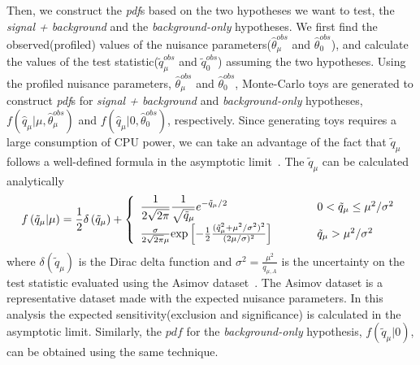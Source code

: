 %
Then, we construct the \textit{pdf}s based on the two hypotheses we 
want to test, the \textit{signal + background} and the \textit{background-only} hypotheses.
We first find the observed(profiled) values of the nuisance 
parameters($\hat{\theta}_\mu^{obs}$ and $\hat{\theta}_0^{obs}$),
and calculate the values of the test statistic($\tilde{q}_\mu^{obs}$ 
and $\tilde{q}_0^{obs}$) assuming the two hypotheses.
Using the profiled nuisance parameters, $\hat{\theta}_\mu^{obs}$ and $\hat{\theta}_0^{obs}$, 
Monte-Carlo toys are generated to construct \textit{pdf}s for \textit{signal + background}
and \textit{background-only} hypotheses, 
$f\left( \hat{q}_\mu | \mu, \hat{\theta}_\mu^{obs} \right)$ and 
$f\left( \hat{q}_\mu | 0, \hat{\theta}_0^{obs} \right)$, respectively.
Since generating toys requires a large consumption of CPU power, 
we can take an advantage of the fact that $\tilde{q}_\mu$ follows 
a well-defined formula in the asymptotic limit~\cite{cowan_asimov}. 
The $\tilde{q}_\mu$ can be calculated analytically
\begin{eqnarray} 
f\left( \tilde{q}_\mu | \mu \right) 
= 
\frac{1}{2} \delta \left( \tilde{q}_\mu \right)  + 
\left\{ \begin{array}{l l}
\displaystyle
\frac{1}{2\sqrt{2\pi}} \frac{1}{\sqrt{\tilde{q}_\mu}}  e^{-\tilde{q}_\mu/2}
   & \quad \quad \quad 0 < \tilde{q}_\mu \le \mu^2/\sigma^2 \\
\frac{\sigma}{2\sqrt{2\pi}\mu} 
   \textrm{exp}\left[-\frac{1}{2} \frac{(\tilde{q}_\mu^2+\mu^2/\sigma^2)^2}{(2\mu/\sigma)^2}   \right]
   & \quad \quad \quad \tilde{q}_\mu > \mu^2/\sigma^2 
\end{array} \right.
\end{eqnarray} 
where $\delta(\tilde{q}_\mu)$ is the Dirac delta function and 
$\displaystyle \sigma^2 = \frac{\mu^2}{q_{\mu,A}}$ 
is the uncertainty on the test statistic evaluated using the Asimov 
dataset~\cite{cowan_asimov}. 
The Asimov dataset is a representative dataset made with the expected 
nuisance parameters. 
In this analysis the expected sensitivity(exclusion and significance) is calculated 
in the asymptotic limit.
Similarly, the $pdf$ for the \textit{background-only} hypothesis,
$f\left( \tilde{q}_\mu | 0 \right)$, can be obtained 
using the same technique. 

